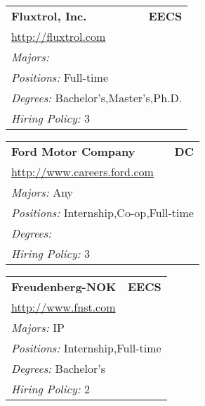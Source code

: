 \documentclass[twoside]{article}
\begin{document}
\begin{center}
\begin{multicols}{3}
\begin{FlushLeft}
\begin{minipage}{.9\columnwidth}
\end{minipage}
 
\begin{minipage}{.9\columnwidth}\begin{tabularx}{.95\columnwidth}{Xr}
                 {\Large\bf Fluxtrol, Inc.} & {\Large\bf EECS}\\
    \multicolumn{2}{p{.95\columnwidth}}{\url{http://fluxtrol.com}}\\
    \multicolumn{2}{p{.95\columnwidth}}{\emph{Majors:} }\\
    \multicolumn{2}{p{.95\columnwidth}}{\emph{Positions:} Full-time}\\
    \multicolumn{2}{p{.95\columnwidth}}{\emph{Degrees:} Bachelor's,Master's,Ph.D.}\\
    \multicolumn{2}{p{.95\columnwidth}}{\emph{Hiring Policy:} 3}\\
    \end{tabularx}
    
\end{minipage}
 
\begin{minipage}{.9\columnwidth}\begin{tabularx}{.95\columnwidth}{Xr}
                 {\Large\bf Ford Motor Company} & {\Large\bf DC}\\
    \multicolumn{2}{p{.95\columnwidth}}{\url{http://www.careers.ford.com}}\\
    \multicolumn{2}{p{.95\columnwidth}}{\emph{Majors:} Any}\\
    \multicolumn{2}{p{.95\columnwidth}}{\emph{Positions:} Internship,Co-op,Full-time}\\
    \multicolumn{2}{p{.95\columnwidth}}{\emph{Degrees:} }\\
    \multicolumn{2}{p{.95\columnwidth}}{\emph{Hiring Policy:} 3}\\
    \end{tabularx}
    
\end{minipage}
 
\begin{minipage}{.9\columnwidth}\begin{tabularx}{.95\columnwidth}{Xr}
                 {\Large\bf Freudenberg-NOK} & {\Large\bf EECS}\\
    \multicolumn{2}{p{.95\columnwidth}}{\url{http://www.fnst.com}}\\
    \multicolumn{2}{p{.95\columnwidth}}{\emph{Majors:} IP}\\
    \multicolumn{2}{p{.95\columnwidth}}{\emph{Positions:} Internship,Full-time}\\
    \multicolumn{2}{p{.95\columnwidth}}{\emph{Degrees:} Bachelor's}\\
    \multicolumn{2}{p{.95\columnwidth}}{\emph{Hiring Policy:} 2}\\
    \end{tabularx}
    

\end{minipage}
\end{FlushLeft}
\end{multicols}
\end{center}
\end{document}
